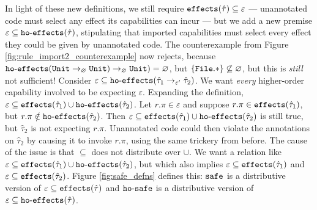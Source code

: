 In light of these new definitions, we still require $\mathtt{effects}(\hat \tau) \subseteq \varepsilon$ --- unannotated code must select any effect its capabilities can incur --- but we add a new premise $\varepsilon \subseteq \mathtt{ho \hbox{-} effects}(\hat \tau)$, stipulating that imported capabilities must select every effect they could be given by unannotated code. The counterexample from Figure \ref{fig:rule_import2_counterexample} now rejects, because $\mathtt{ho \hbox{-} effects}(\mathtt{Unit} \rightarrow_{\varnothing} \mathtt{Unit}) \rightarrow_{\varnothing} \mathtt{Unit}) = \varnothing$, but $\{ \mathtt{File.*} \} \not\subseteq \varnothing$, but this is \textit{still} not sufficient! Consider $\varepsilon \subseteq \mathtt{ho \hbox{-} effects}( \hat \tau_1 \rightarrow_{\varepsilon'} \hat \tau_2 )$. We want \textit{every} higher-order capability involved to be expecting $\varepsilon$. Expanding the definition, $\varepsilon \subseteq \mathtt{effects}(\hat \tau_1) \cup \mathtt{ho \hbox{-} effects}(\hat \tau_2)$. Let $r.\pi \in \varepsilon$ and suppose $r.\pi \in \mathtt{effects}(\hat \tau_1)$, but $r.\pi \notin \mathtt{ho \hbox{-} effects}(\hat \tau_2)$. Then $\varepsilon \subseteq \mathtt{effects}(\hat \tau_1) \cup \mathtt{ho \hbox{-} effects}(\hat \tau_2)$ is still true, but $\hat \tau_2$ is not expecting $r.\pi$. Unannotated code could then violate the annotations on $\hat \tau_2$ by causing it to invoke $r.\pi$, using the same trickery from before. The cause of the issue is that $\subseteq$ does not distribute over $\cup$. We want a relation like $\varepsilon \subseteq \mathtt{effects}(\hat \tau_1) \cup \mathtt{ho \hbox{-} effects}(\hat \tau_2)$, but which also implies $\varepsilon \subseteq \mathtt{effects}(\hat \tau_1)$ and $\varepsilon \subseteq \mathtt{effects}(\hat \tau_2)$. Figure \ref{fig:safe_defns} defines this: $\mathtt{safe}$ is a distributive version of $\varepsilon \subseteq \mathtt{effects}(\hat \tau)$ and $\mathtt{ho \hbox{-} safe}$ is a distributive version of $\varepsilon \subseteq \mathtt{ho \hbox{-} effects}(\hat \tau)$.


